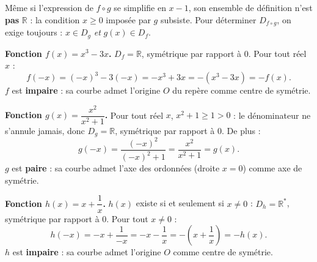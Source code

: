 \documentclass[11pt]{article}
\begin{document}
\begin{attention}
Même si l'expression de $f\circ g$ se simplifie en $x-1$, son ensemble de définition n'est \textbf{pas} $\mathbb{R}$ : la condition $x\geq 0$ imposée par $g$ subsiste. Pour déterminer $D_{f\circ g}$, on exige toujours : $x\in D_g$ \emph{et} $g(x)\in D_f$.
\end{attention}

\begin{corrige}
\textbf{Fonction $f(x)=x^3-3x$.} $D_f=\mathbb{R}$, symétrique par rapport à $0$. Pour tout réel $x$ :
\[ f(-x)=(-x)^3-3(-x)=-x^3+3x=-(x^3-3x)=-f(x). \]
$f$ est \textbf{impaire} : sa courbe admet l'origine $O$ du repère comme centre de symétrie.

\textbf{Fonction $g(x)=\dfrac{x^2}{x^2+1}$.} Pour tout réel $x$, $x^2+1\geq 1>0$ : le dénominateur ne s'annule jamais, donc $D_g=\mathbb{R}$, symétrique par rapport à $0$. De plus :
\[ g(-x)=\frac{(-x)^2}{(-x)^2+1}=\frac{x^2}{x^2+1}=g(x). \]
$g$ est \textbf{paire} : sa courbe admet l'axe des ordonnées (droite $x=0$) comme axe de symétrie.

\textbf{Fonction $h(x)=x+\dfrac{1}{x}$.} $h(x)$ existe si et seulement si $x\neq 0$ : $D_h=\mathbb{R}^*$, symétrique par rapport à $0$. Pour tout $x\neq 0$ :
\[ h(-x)=-x+\frac{1}{-x}=-x-\frac{1}{x}=-\left(x+\frac{1}{x}\right)=-h(x). \]
$h$ est \textbf{impaire} : sa courbe admet l'origine $O$ comme centre de symétrie.
\end{corrige}
\end{document}
